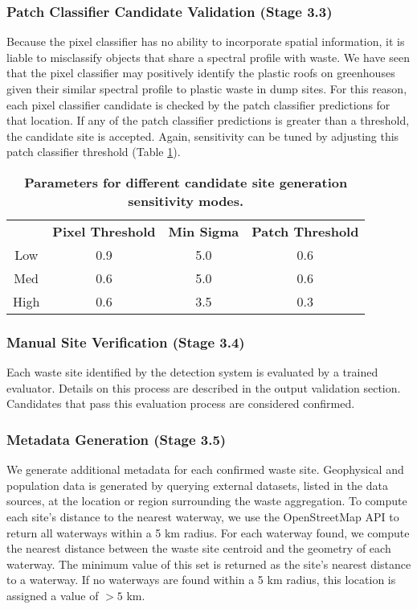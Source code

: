 \documentclass[10pt,letterpaper]{article}
\begin{document}
\subsubsection*{Patch Classifier Candidate Validation (Stage 3.3)}
Because the pixel classifier has no ability to incorporate spatial information, it is liable to misclassify objects that share a spectral profile with waste. We have seen that the pixel classifier may positively identify the plastic roofs on greenhouses given their similar spectral profile to plastic waste in dump sites. For this reason, each pixel classifier candidate is checked by the patch classifier predictions for that location. If any of the patch classifier predictions is greater than a threshold, the candidate site is accepted. Again, sensitivity can be tuned by adjusting this patch classifier threshold (Table \ref{table:sensitivity_modes}).

\begin{table}[!ht]
\begin{adjustwidth}{-2.25in}{0in}
    \caption{\textbf{ Parameters for different candidate site generation sensitivity modes.}}
    \label{table:sensitivity_modes}
    \begin{tabular}{ *{4}{c} }
    \toprule &  \textbf{Pixel Threshold} & \textbf{Min Sigma} & \textbf{Patch Threshold}\\
        \cmidrule{2-4}
        Low & 0.9 & 5.0 & 0.6 \\
        Med & 0.6 & 5.0 & 0.6 \\
        High & 0.6 & 3.5 & 0.3 \\
        \bottomrule
    \end{tabular}
    \end{adjustwidth}
\end{table}

\subsubsection*{Manual Site Verification (Stage 3.4)} \label{site_verification}
Each waste site identified by the detection system is evaluated by a trained evaluator. Details on this process are described in the output validation section. Candidates that pass this evaluation process are considered confirmed.

\subsubsection*{Metadata Generation (Stage 3.5)} \label{metadata}
We generate additional metadata for each confirmed waste site. Geophysical and population data is generated by querying external datasets, listed in the data sources, at the location or region surrounding the waste aggregation. To compute each site’s distance to the nearest waterway, we use the OpenStreetMap API to return all waterways within a 5 km radius. For each waterway found, we compute the nearest distance between the waste site centroid and the geometry of each waterway. The minimum value of this set is returned as the site's nearest distance to a waterway. If no waterways are found within a 5 km radius, this location is assigned a value of $>5$ km.
\end{document}

